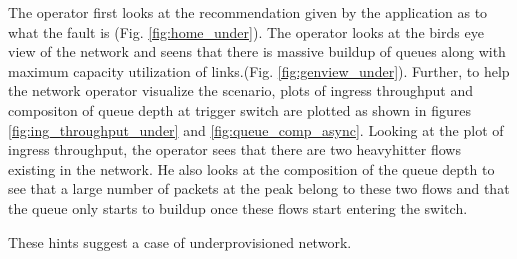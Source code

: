 The operator first looks at the recommendation given by the application as to what the fault is (Fig. \ref{fig:home_under}).
The operator looks at the birds eye view of the network and seens that there is massive buildup of queues along with maximum
capacity utilization of links.(Fig. \ref{fig:genview_under}).
Further, to help the network operator visualize the scenario, plots of ingress throughput and compositon of queue depth at 
trigger switch are plotted as shown in figures \ref{fig:ing_throughput_under} and \ref{fig:queue_comp_async}.
Looking at the plot of ingress throughput, the operator sees that there are two heavyhitter flows existing in the network.
He also looks at the composition of the queue depth to see that a large number of packets at the peak belong to these two flows and
that the queue only starts to buildup once these flows start entering the switch.

These hints suggest a case of underprovisioned network.

